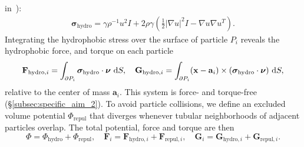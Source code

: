 in~\cite{Fu2018_SIAM}):
\begin{align}
  \label{stress}
\boldsymbol{\sigma}_{\text{hydro}} = \gamma \rho^{-1} u^2 I + 2\rho \gamma (\tfrac{1}{2}|\nabla u|^2I - \nabla u \nabla u^T).
\end{align}
%
%
Integrating the hydrophobic stress over the surface of particle $P_i$
reveals the hydrophobic force, and torque on each particle 
\begin{align}
  \label{forceandtorque}
  \mathbf{F}_{\text{hydro},i} = \int_{\partial P_i} \boldsymbol{\sigma}_{\text{hydro}}
  \cdot \boldsymbol{\nu} \,\dif S,\quad
  \mathbf{G}_{\text{hydro},i} = \int_{\partial P_i} (\mathbf{x}-\mathbf{a}_i) \times
  (\boldsymbol{\sigma}_{\text{hydro}} \cdot \boldsymbol{\nu}) \,\dif S,
\end{align}
relative to the center of mass $\mathbf{a}_i$. This system is force- and
torque-free (\S\ref{subsec:specific_aim_2}). To avoid particle
collisions, we define an excluded volume potential $\Phi_{\text{repul}}$
that diverges whenever tubular neighborhoods of adjacent particles
overlap. The total potential, force and torque are then
\begin{equation}
\label{eq:total_poten}
\Phi = \Phi_{\text{hydro}} + \Phi_{\text{repul}},\quad
\mathbf{F}_{i} = \mathbf{F}_{\text{hydro},i} + \mathbf{F}_{\text{repul},i},\quad
\mathbf{G}_{i} = \mathbf{G}_{\text{hydro},i} + \mathbf{G}_{\text{repul},i}.
\end{equation}

